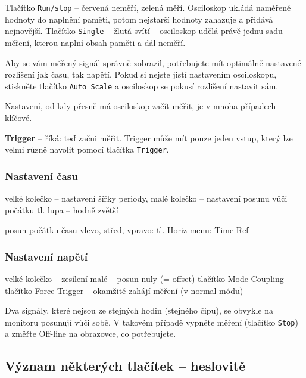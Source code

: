 Tlačítko \texttt{Run/stop} -- červená neměří, zelená měří. Osciloskop ukládá naměřené hodnoty do naplnění paměti, potom nejstarší hodnoty zahazuje a přidává nejnovější. 
Tlačítko \texttt{Single} -- žlutá svítí -- osciloskop udělá právě jednu sadu měření, kterou naplní obsah paměti a dál neměří. 

Aby se vám měřený signál správně zobrazil, potřebujete mít optimálně nastavené rozlišení jak času, tak napětí. %
Pokud si nejste jistí  nastavením osciloskopu, stiskněte tlačítko \texttt{Auto Scale} a osciloskop se pokusí rozlišení nastavit sám. 





Nastavení, od kdy přesně má osciloskop začít měřit, je v mnoha případech klíčové. 


\textbf{Trigger} -- říká: teď začni měřit. Trigger může mít pouze jeden vstup, který lze velmi různě navolit pomocí tlačítka \texttt{Trigger}.
 


\subsubsection{Nastavení času}
 
velké kolečko -- nastavení šířky periody, 
malé kolečko -- nastavení posunu vůči počátku 
tl. lupa -- hodně zvětší 

posun počátku času vlevo, střed, vpravo: tl. Horiz menu: Time Ref 

\subsubsection{Nastavení napětí}

velké kolečko -- zesílení 
malé -- posun nuly (= offset)
tlačítko Mode Coupling %
tlačítko Force Trigger -- okamžitě zahájí měření (v normal módu) 

Dva signály, které nejsou ze stejných hodin (stejného čipu), se obvykle na monitoru posunují vůči sobě. V takovém případě vypněte 
měření (tlačítko \texttt{Stop}) a změřte Off-line na obrazovce, co potřebujete.



\subsection{Význam některých tlačítek -- heslovitě}

